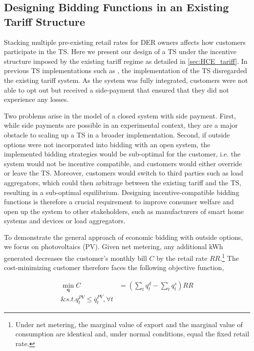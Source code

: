 \subsection{Designing Bidding Functions in an Existing Tariff Structure}\label{sec:HCE_design}

Stacking multiple pre-existing retail rates for DER owners affects how customers participate in the TS. Here we present our design of a TS under the incentive structure imposed by the existing tariff regime as detailed in \cref{sec:HCE_tariff}. 
In previous TS implementations such as \citet{hammerstrom_2008}, the implementation of the TS disregarded the existing tariff system. As the system was fully integrated, customers were not able to opt out but received a side-payment that ensured that they did not experience any losses.

Two problems arise in the model of a closed system with side payment. 
First, while side payments are possible in an experimental context, they are a major obstacle to scaling up a TS in a broader implementation. 
Second, if outside options were not incorporated into bidding with an open system, the implemented bidding strategies would be sub-optimal for the customer, i.e. the system would not be incentive compatible, and customers would either override or leave the TS. Moreover, customers would switch to third parties such as load aggregators, which could then arbitrage between the existing tariff and the TS, resulting in a sub-optimal equilibrium.
Designing incentive-compatible bidding functions is therefore a crucial requirement to improve consumer welfare and open up the system to other stakeholders, such as manufacturers of smart home systems and devices or load aggregators.

To demonstrate the general approach of economic bidding with outside options, we focus on photovoltaics (PV).
Given net metering, any additional kWh generated decreases the customer's monthly bill $C$ by the retail rate $RR$.\footnote{Under net metering, the marginal value of export and the marginal value of consumption are identical and, under normal conditions, equal the fixed retail rate.} The cost-minimizing customer therefore faces the following objective function,

\begin{align}
    \min_\mathbf{q} C &= (\sum_t q^d_t - \sum_t q^s_t) RR \\
    \& s.t. q^{PV}_t \leq \overline{q}^{PV}_t, \forall t \nonumber
\end{align}

